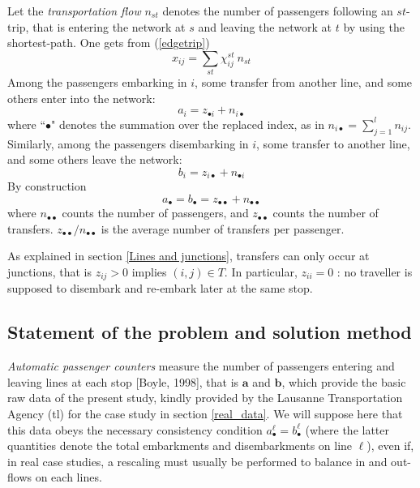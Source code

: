 \documentclass{bmcart}
\begin{document}
\vspace*{0.1cm}

Let the \emph{transportation flow} $n_{st}$ denotes the number of passengers following an $st$-trip, that is entering the network at $s$ and leaving the network at $t$ by using the shortest-path. One gets from (\ref{edgetrip}) 
\begin{equation}
\label{equationGG}
x_{ij}=\sum_{st}\chi_{ij}^{st}\:  n_{st}
\end{equation}
Among the passengers embarking in $i$, some transfer from another line, and some others enter into the network: 
\begin{equation}
\label{entrer}
a_i=z_{\bullet i}+n_{i\bullet}
\end{equation}
where  ``$\bullet$" denotes the summation over the replaced index, as in $n_{i\bullet}=\sum_{j=1}^l n_{ij}$. Similarly, among the passengers disembarking in $i$, some transfer to another line, and some others leave the network: 
\begin{equation}
\label{sortir}
b_i=z_{i\bullet}+n_{\bullet i}
\end{equation}
By construction
\begin{displaymath}
a_{\bullet}=b_{\bullet}=z_{\bullet\bullet}+n_{\bullet\bullet}
\end{displaymath}
where $n_{\bullet\bullet}$ counts the number of passengers, and $z_{\bullet\bullet}$ counts the number of transfers. $z_{\bullet\bullet}/n_{\bullet\bullet}$  is the average number of transfers per passenger. 

\vspace*{0.1cm}



As explained in section \ref{Lines and junctions}, transfers can only occur at junctions, that is $z_{ij}>0$ implies $(i, j) \in T$. In particular,  $z_{ii}=0$ : no traveller is supposed to disembark and re-embark later at the same stop. 


 
\subsection{Statement of the problem and solution method}
\emph{Automatic passenger counters} measure the number of passengers entering and leaving lines at each stop [Boyle, 1998], that is $\mathbf{a}$ and $\mathbf{b}$, which provide the basic raw data of the present study, kindly provided by the Lausanne Transportation Agency (tl) for the case study in section \ref{real_data}. We will suppose here that this data obeys the necessary consistency condition $a_\bullet^\ell=b_\bullet^\ell$ (where the latter quantities denote the total embarkments and disembarkments on line $\ell$), even if, in real case studies, a rescaling must usually be performed to balance in and out-flows on each lines.
\end{document}
